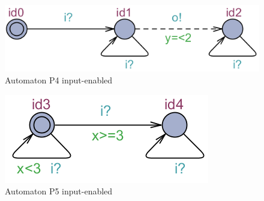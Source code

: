 \begin{figure}
    \centering
    \includegraphics[scale = 0.7]{figures/P4InputEnabled.png}
    \caption{Automaton P4 input-enabled}
    \label{fig:P4InputE}
\end{figure}
\begin{figure}
    \centering
    \includegraphics[scale = 0.7]{figures/P5InputEnabled.png}
    \caption{Automaton P5 input-enabled}
    \label{fig:P5InputE}
\end{figure}
